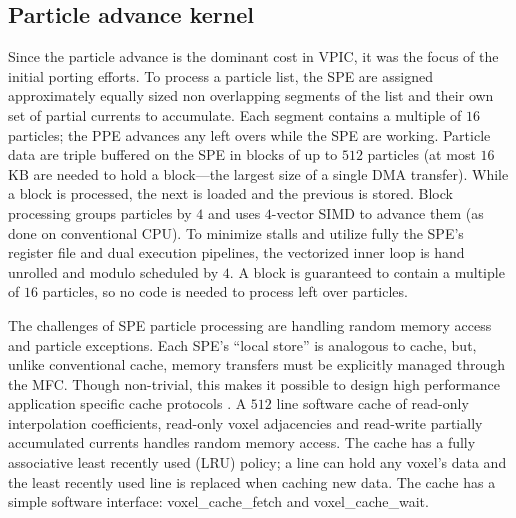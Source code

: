 \documentclass[letter,10pt]{article}
\begin{document}

\subsection{Particle advance kernel}

Since the particle advance is the dominant cost in VPIC, it was the
focus of the initial porting efforts.  To process a particle list, the
SPE are assigned approximately equally sized non overlapping segments
of the list and their own set of partial currents to accumulate.  Each
segment contains a multiple of $16$ particles; the PPE advances any
left overs while the SPE are working.  Particle data are triple
buffered on the SPE in blocks of up to $512$ particles (at most $16$
KB are needed to hold a block---the largest size of a single DMA
transfer).  While a block is processed, the next is loaded and the
previous is stored.
Block processing groups particles by $4$ and uses $4$-vector SIMD to
advance them (as done on conventional CPU).  To minimize
stalls and utilize fully the SPE's register file and dual execution
pipelines, the vectorized inner loop is hand unrolled and modulo
scheduled by $4$.  A block is guaranteed to contain a multiple
of $16$ particles, so no code is needed to process left over particles.

The challenges of SPE particle processing are handling random memory
access and particle exceptions.  Each SPE's ``local store'' is
analogous to cache, but, unlike conventional cache, memory transfers
must be explicitly managed through the MFC.  Though
non-trivial, this makes it possible to design high performance
application specific cache protocols \cite{Kahle_et_al_2005}.  A $512$
line software cache of read-only interpolation coefficients, read-only
voxel adjacencies and read-write partially accumulated currents
handles random memory access.  The cache has a fully associative least
recently used (LRU) policy; a line can hold any voxel's data and the
least recently used line is replaced when caching new data.  The cache
has a simple software interface: voxel\_cache\_fetch and
voxel\_cache\_wait.
\end{document}

